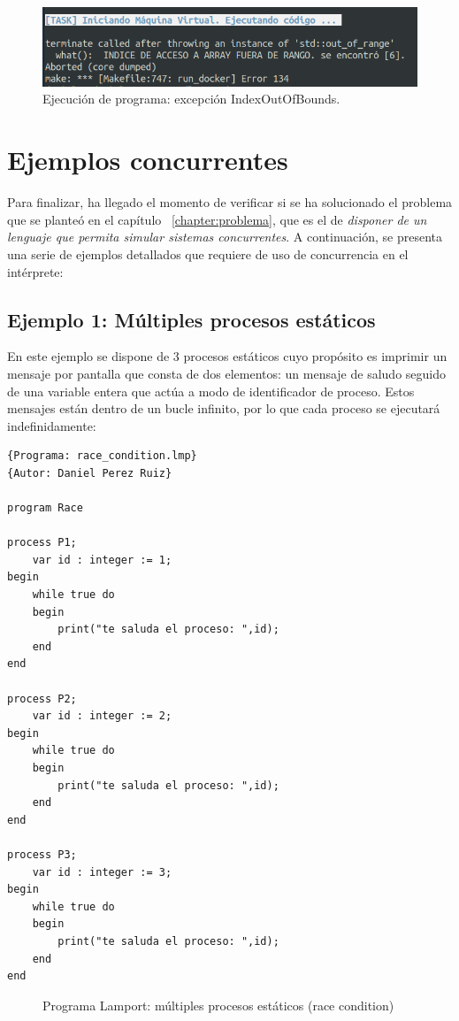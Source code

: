 \newpage
\begin{figure}[h]
    \includegraphics[width=\linewidth]{images/ejemplos/exceptions/out_of_bounds.png}
    \caption{Ejecución de programa: excepción IndexOutOfBounds.}
    \label{fig:lamportExceptionOutOfBounds_exec}
\end{figure}

\section{Ejemplos concurrentes}
Para finalizar, ha llegado el momento de verificar si se ha solucionado el problema que se planteó en el capítulo ~\ref{chapter:problema}, que es el de \textit{disponer de un lenguaje que permita simular sistemas concurrentes}. A continuación, se presenta una serie de ejemplos detallados que requiere de uso de concurrencia en el intérprete:

\subsection{Ejemplo 1: Múltiples procesos estáticos}
En este ejemplo se dispone de 3 procesos estáticos cuyo propósito es imprimir un mensaje por pantalla que consta de dos elementos: un mensaje de saludo seguido de una variable entera que actúa a modo de identificador de proceso. Estos mensajes están dentro de un bucle infinito, por lo que cada proceso se ejecutará indefinidamente:
\begin{lstlisting}[style=lamportStyle]
{Programa: race_condition.lmp}
{Autor: Daniel Perez Ruiz}

program Race

process P1;
	var id : integer := 1;
begin
	while true do
	begin
		print("te saluda el proceso: ",id);
	end
end

process P2;
	var id : integer := 2;
begin
	while true do
	begin
		print("te saluda el proceso: ",id);
	end
end

process P3;
	var id : integer := 3;
begin
	while true do
	begin
		print("te saluda el proceso: ",id);
	end
end
\end{lstlisting}
\begin{figure}[h]
\caption{Programa Lamport: múltiples procesos estáticos (race condition)}
\label{fig:lamportMultipleProcess}
\end{figure}

